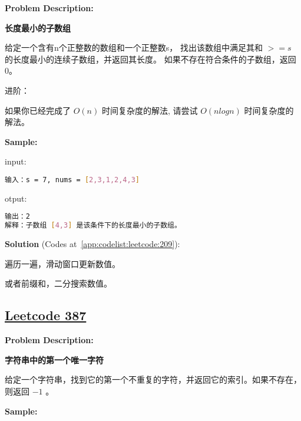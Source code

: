 \textbf{Problem Description:}\par

\textbf{长度最小的子数组}\par

给定一个含有n个正整数的数组和一个正整数s，
找出该数组中满足其和 $ >= s $ 的长度最小的连续子数组，并返回其长度。
如果不存在符合条件的子数组，返回 0。\par

进阶：\par

如果你已经完成了 $ O(n) $ 时间复杂度的解法, 请尝试 $ O(n log n) $ 时间复杂度的解法。\par


\textbf{Sample:}\par

input:\par

\begin{lstlisting}[language=bash]
输入：s = 7, nums = [2,3,1,2,4,3]
\end{lstlisting}

otput:\par

\begin{lstlisting}[language=bash]
输出：2
解释：子数组 [4,3] 是该条件下的长度最小的子数组。
\end{lstlisting}

\textbf{Solution }(Codes at~\ref{app:codelist:leetcode:209}):\par

遍历一遍，滑动窗口更新数值。\par

或者前缀和，二分搜索数值。\par



\subsection{\href{https://leetcode-cn.com/}{Leetcode 387}}\label{app:problemlist:leetcode:387}

\textbf{Problem Description:}\par

\textbf{字符串中的第一个唯一字符}\par

给定一个字符串，找到它的第一个不重复的字符，并返回它的索引。如果不存在，则返回 $ -1 $ 。\par


\textbf{Sample:}\par

